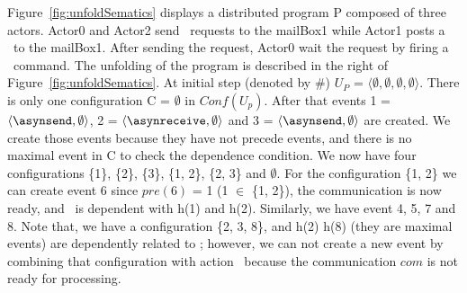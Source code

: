 \documentclass[a4paper,11pt]{article}
\begin{document}
Figure~\ref{fig:unfoldSematics} displays a distributed program P composed of three actors. Actor0 and Actor2 send \asynsend~requests to the mailBox1 while Actor1 posts a \asynreceive~to the mailBox1. After sending the request, Actor0 wait the request by firing a \wait~command. The unfolding of the program is described in the right of Figure~\ref{fig:unfoldSematics}. At initial step (denoted by \#) $U_P$ = $\langle \emptyset, \emptyset, \emptyset,\emptyset \rangle$. There is only one configuration C = $\emptyset$ in $Conf(U_p)$. After that events 1 = $\langle \asynsend, \emptyset \rangle$, 2 = $\langle \asynreceive, \emptyset \rangle$ and 3 = $\langle \asynsend, \emptyset \rangle$ are created. We create those events because they have not  precede events, and there is no maximal event in  C to check the dependence condition. We now have four configurations \{1\}, \{2\}, \{3\}, \{1, 2\}, \{2, 3\} and $\emptyset$. For the configuration \{1, 2\} we can create event 6 since $pre(6)$ = 1 (1 $\in$ \{1, 2\}), the communication is now ready, and \wait~is dependent with h(1) and h(2). Similarly, we have event 4, 5, 7 and 8. Note that, we have a configuration \{2, 3, 8\}, and h(2) h(8) (they are maximal events) are dependently related to \wait; however, we can not create a new event by combining that configuration with action \wait~because the communication $com$ is not ready for processing.
\end{document}
